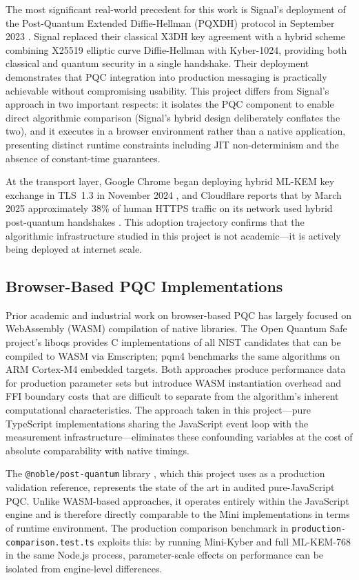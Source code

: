\documentclass[11pt,a4paper]{article}
\begin{document}
The most significant real-world precedent for this work is Signal's deployment of the Post-Quantum Extended Diffie-Hellman (PQXDH) protocol in September 2023 \cite{signal_pqxdh}. Signal replaced their classical X3DH key agreement with a hybrid scheme combining X25519 elliptic curve Diffie-Hellman with Kyber-1024, providing both classical and quantum security in a single handshake. Their deployment demonstrates that PQC integration into production messaging is practically achievable without compromising usability. This project differs from Signal's approach in two important respects: it isolates the PQC component to enable direct algorithmic comparison (Signal's hybrid design deliberately conflates the two), and it executes in a browser environment rather than a native application, presenting distinct runtime constraints including JIT non-determinism and the absence of constant-time guarantees.

At the transport layer, Google Chrome began deploying hybrid ML-KEM key exchange in TLS~1.3 in November 2024 \cite{tls13}, and Cloudflare reports that by March 2025 approximately 38\% of human HTTPS traffic on its network used hybrid post-quantum handshakes \cite{nist_migration}. This adoption trajectory confirms that the algorithmic infrastructure studied in this project is not academic—it is actively being deployed at internet scale.

\subsection{Browser-Based PQC Implementations}

Prior academic and industrial work on browser-based PQC has largely focused on WebAssembly (WASM) compilation of native libraries. The Open Quantum Safe project's liboqs \cite{noble_pq} provides C implementations of all NIST candidates that can be compiled to WASM via Emscripten; pqm4 \cite{pqm4} benchmarks the same algorithms on ARM Cortex-M4 embedded targets. Both approaches produce performance data for production parameter sets but introduce WASM instantiation overhead and FFI boundary costs that are difficult to separate from the algorithm's inherent computational characteristics. The approach taken in this project---pure TypeScript implementations sharing the JavaScript event loop with the measurement infrastructure---eliminates these confounding variables at the cost of absolute comparability with native timings.

The \texttt{@noble/post-quantum} library \cite{noble_pq}, which this project uses as a production validation reference, represents the state of the art in audited pure-JavaScript PQC. Unlike WASM-based approaches, it operates entirely within the JavaScript engine and is therefore directly comparable to the Mini implementations in terms of runtime environment. The production comparison benchmark in \texttt{production-comparison.test.ts} exploits this: by running Mini-Kyber and full ML-KEM-768 in the same Node.js process, parameter-scale effects on performance can be isolated from engine-level differences.
\end{document}
